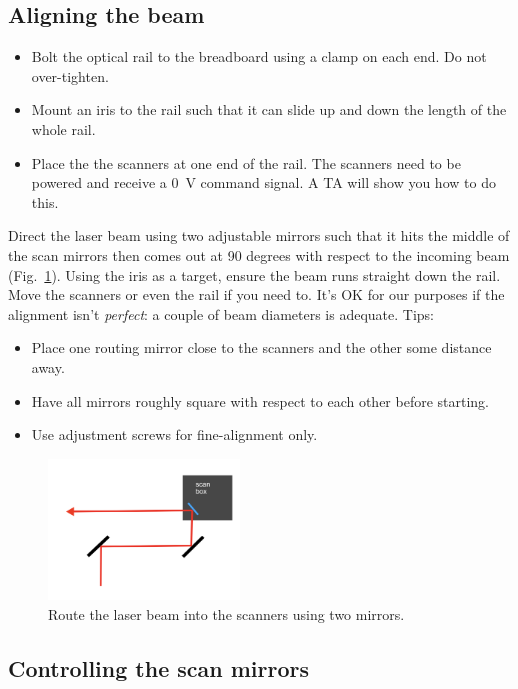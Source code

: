 \documentclass[a4paper]{report}
\begin{document}
\subsection{Aligning the beam}
\begin{itemize}
\setlength\itemsep{0.15em}
\item Bolt the optical rail to the breadboard using a clamp on each end. Do not over-tighten. 
\item Mount an iris to the rail such that it can slide up and down the length of the whole rail.
\item Place the the scanners at one end of the rail. 
The scanners need to be powered and receive a 0~V command signal. 
A TA will show you how to do this. 
\end{itemize}

\noindent
Direct the laser beam using two adjustable mirrors such that it hits the middle of the scan mirrors then comes out at 90 degrees with respect to the incoming beam (Fig.~\ref{scannersAndBeam}). 
Using the iris as a target, ensure the beam runs straight down the rail. 
Move the scanners or even the rail if you need to.
It's OK for our purposes if the alignment isn't \textit{perfect}: a couple of beam diameters is adequate. 
Tips:
\begin{itemize}
\setlength\itemsep{0.15em}
\item Place one routing mirror close to the scanners and the other some distance away. 
\item Have all mirrors roughly square with respect to each other before starting.
\item Use adjustment screws for fine-alignment only.
\end{itemize}


\begin{figure}[h]
\centering
\includegraphics[width=2.0in]{beamintoscanner.png}
\caption{Route the laser beam into the scanners using two mirrors.}
\label{scannersAndBeam}
\end{figure}

\subsection{Controlling the scan mirrors}
\end{document}
